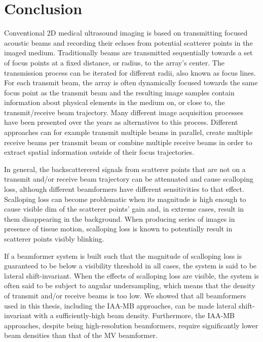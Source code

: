 
\chapter{Conclusion}
\label{chap:conclusion}
Conventional 2D medical ultrasound imaging is based on transmitting focused acoustic beams and recording their echoes from potential scatterer points in the imaged medium.
Traditionally beams are transmitted sequentially towards a set of focus points at a fixed distance, or radius, to the array's center.
The transmission process can be iterated for different radii, also known as focus lines.
For each transmit beam, the array is often dynamically focused towards the same focus point as the transmit beam and the resulting image samples contain information about physical elements in the medium on, or close to, the transmit/receive beam trajectory.
Many different image acquisition processes have been presented over the years as alternatives to this process. Different approaches can for example transmit multiple beams in parallel, create multiple receive beams per transmit beam or combine multiple receive beams in order to extract spatial information outside of their focus trajectories.

In general, the backscatterered signals from scatterer points that are not on a transmit and/or receive beam trajectory can be attenuated and cause scalloping loss, although different beamformers have different sensitivities to that effect.
Scalloping loss can become problematic when its magnitude is high enough to cause visible dim of the scatterer points' gain and, in extreme cases, result in them disappearing in the background.
When producing series of images in presence of tissue motion, scalloping loss is known to potentially result in scatterer points visibly blinking.

If a beamformer system is built such that the magnitude of scalloping loss is guaranteed to be below a visibility threshold in all cases, the system is said to be lateral shift-invariant.
When the effects of scalloping loss are visible, the system is often said to be subject to angular undersampling, which means that the density of transmit and/or receive beams is too low.
We showed that all beamformers used in this thesis, including the IAA-MB approaches, can be made lateral shift-invariant with a sufficiently-high beam density.
Furthermore, the IAA-MB approaches, despite being high-resolution beamformers, require significantly lower beam densities than that of the MV beamformer.

